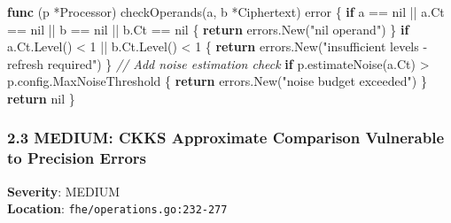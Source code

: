 \documentclass[
]{article}
\newenvironment{Shaded}{}{}
\newcommand{\CommentTok}[1]{\textcolor[rgb]{0.38,0.63,0.69}{\textit{#1}}}
\newcommand{\ControlFlowTok}[1]{\textcolor[rgb]{0.00,0.44,0.13}{\textbf{#1}}}
\newcommand{\DataTypeTok}[1]{\textcolor[rgb]{0.56,0.13,0.00}{#1}}
\newcommand{\DecValTok}[1]{\textcolor[rgb]{0.25,0.63,0.44}{#1}}
\newcommand{\KeywordTok}[1]{\textcolor[rgb]{0.00,0.44,0.13}{\textbf{#1}}}
\newcommand{\NormalTok}[1]{#1}
\newcommand{\OperatorTok}[1]{\textcolor[rgb]{0.40,0.40,0.40}{#1}}
\newcommand{\OtherTok}[1]{\textcolor[rgb]{0.00,0.44,0.13}{#1}}
\newcommand{\StringTok}[1]{\textcolor[rgb]{0.25,0.44,0.63}{#1}}
\begin{document}
\begin{Shaded}
\begin{Highlighting}[]
\KeywordTok{func} \OperatorTok{(}\NormalTok{p }\OperatorTok{*}\NormalTok{Processor}\OperatorTok{)}\NormalTok{ checkOperands}\OperatorTok{(}\NormalTok{a}\OperatorTok{,}\NormalTok{ b }\OperatorTok{*}\NormalTok{Ciphertext}\OperatorTok{)} \DataTypeTok{error} \OperatorTok{\{}
    \ControlFlowTok{if}\NormalTok{ a }\OperatorTok{==} \OtherTok{nil} \OperatorTok{||}\NormalTok{ a}\OperatorTok{.}\NormalTok{Ct }\OperatorTok{==} \OtherTok{nil} \OperatorTok{||}\NormalTok{ b }\OperatorTok{==} \OtherTok{nil} \OperatorTok{||}\NormalTok{ b}\OperatorTok{.}\NormalTok{Ct }\OperatorTok{==} \OtherTok{nil} \OperatorTok{\{}
        \ControlFlowTok{return}\NormalTok{ errors}\OperatorTok{.}\NormalTok{New}\OperatorTok{(}\StringTok{"nil operand"}\OperatorTok{)}
    \OperatorTok{\}}
    \ControlFlowTok{if}\NormalTok{ a}\OperatorTok{.}\NormalTok{Ct}\OperatorTok{.}\NormalTok{Level}\OperatorTok{()} \OperatorTok{\textless{}} \DecValTok{1} \OperatorTok{||}\NormalTok{ b}\OperatorTok{.}\NormalTok{Ct}\OperatorTok{.}\NormalTok{Level}\OperatorTok{()} \OperatorTok{\textless{}} \DecValTok{1} \OperatorTok{\{}
        \ControlFlowTok{return}\NormalTok{ errors}\OperatorTok{.}\NormalTok{New}\OperatorTok{(}\StringTok{"insufficient levels {-} refresh required"}\OperatorTok{)}
    \OperatorTok{\}}
    \CommentTok{// Add noise estimation check}
    \ControlFlowTok{if}\NormalTok{ p}\OperatorTok{.}\NormalTok{estimateNoise}\OperatorTok{(}\NormalTok{a}\OperatorTok{.}\NormalTok{Ct}\OperatorTok{)} \OperatorTok{\textgreater{}}\NormalTok{ p}\OperatorTok{.}\NormalTok{config}\OperatorTok{.}\NormalTok{MaxNoiseThreshold }\OperatorTok{\{}
        \ControlFlowTok{return}\NormalTok{ errors}\OperatorTok{.}\NormalTok{New}\OperatorTok{(}\StringTok{"noise budget exceeded"}\OperatorTok{)}
    \OperatorTok{\}}
    \ControlFlowTok{return} \OtherTok{nil}
\OperatorTok{\}}
\end{Highlighting}
\end{Shaded}

\subsubsection{2.3 MEDIUM: CKKS Approximate Comparison Vulnerable to
Precision
Errors}\label{23-medium-ckks-approximate-comparison-vulnerable-to-precision-errors}

\textbf{Severity}: MEDIUM\\
\textbf{Location}: \texttt{fhe/operations.go:232-277}
\end{document}
